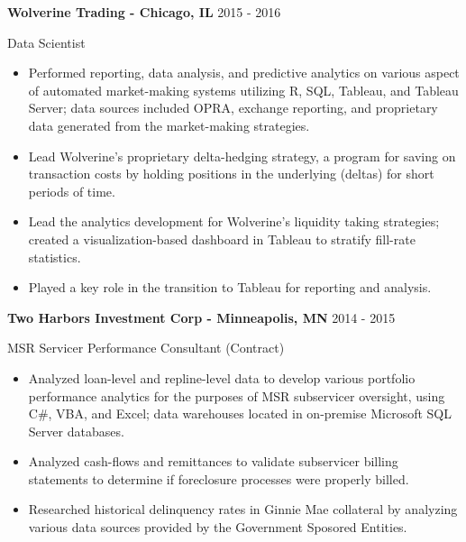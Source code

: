 \documentclass[11pt, a4paper]{awesome-cv}
\begin{document}
\normalsize

\textbf{Wolverine Trading - Chicago, IL} \hfill 2015 - 2016

\vspace{-1ex}

Data Scientist

\vspace{-1.5ex}

\small

\begin{itemize}
\item
  Performed reporting, data analysis, and predictive analytics on
  various aspect of automated market-making systems utilizing R, SQL,
  Tableau, and Tableau Server; data sources included OPRA, exchange
  reporting, and proprietary data generated from the market-making
  strategies. \vspace{-0.5ex}
\item
  Lead Wolverine's proprietary delta-hedging strategy, a program for
  saving on transaction costs by holding positions in the underlying
  (deltas) for short periods of time. \vspace{-0.5ex}
\item
  Lead the analytics development for Wolverine's liquidity taking
  strategies; created a visualization-based dashboard in Tableau to
  stratify fill-rate statistics. \vspace{-0.5ex}
\item
  Played a key role in the transition to Tableau for reporting and
  analysis. \vspace{-0.5ex}
\end{itemize}

\normalsize

\textbf{Two Harbors Investment Corp - Minneapolis, MN } \hfill 2014 -
2015

\vspace{-1ex}

MSR Servicer Performance Consultant (Contract)

\vspace{-1.5ex}

\small

\begin{itemize}
\item
  Analyzed loan-level and repline-level data to develop various
  portfolio performance analytics for the purposes of MSR subservicer
  oversight, using C\#, VBA, and Excel; data warehouses located in
  on-premise Microsoft SQL Server databases. \vspace{-0.5ex}
\item
  Analyzed cash-flows and remittances to validate subservicer billing
  statements to determine if foreclosure processes were properly billed.
  \vspace{-0.5ex}
\item
  Researched historical delinquency rates in Ginnie Mae collateral by
  analyzing various data sources provided by the Government Sposored
  Entities. \vspace{-0.5ex}
\end{itemize}
\end{document}
